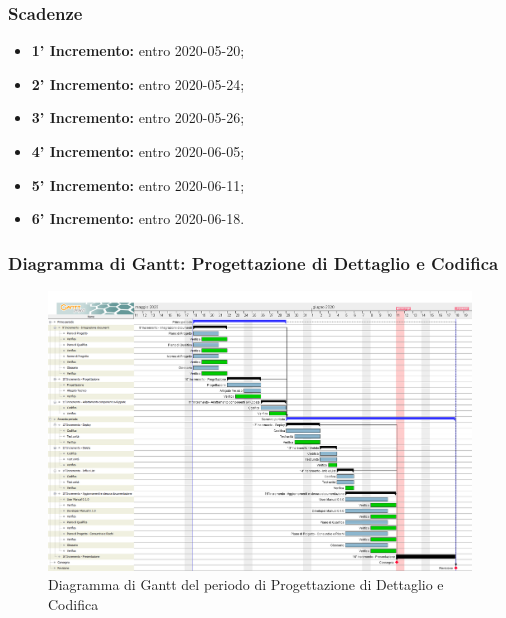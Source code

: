 		\subsubsection{Scadenze}
			\begin{itemize}
				\item \textbf{1' Incremento:} entro 2020-05-20;
				\item \textbf{2' Incremento:} entro 2020-05-24;
				\item \textbf{3' Incremento:} entro 2020-05-26;
				\item \textbf{4' Incremento:} entro 2020-06-05;
				\item \textbf{5' Incremento:} entro 2020-06-11;
				\item \textbf{6' Incremento:} entro 2020-06-18.
			\end{itemize}
	\subsubsection{Diagramma di Gantt: Progettazione di Dettaglio e Codifica}
		\begin{figure}[h]
			\centering
			\includegraphics[width=1.1\textwidth]{./res/img/DiagrammiGantt/prog_dett_gantt.png}
			\caption{Diagramma di Gantt del periodo di Progettazione di Dettaglio e Codifica}
		\end{figure}
\newpage
